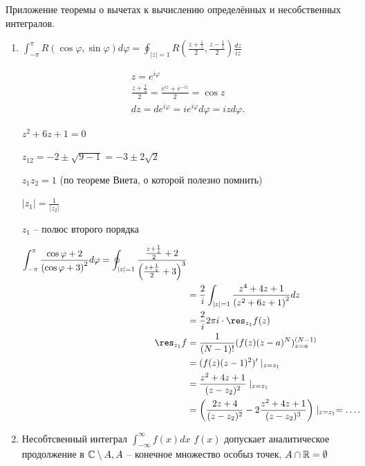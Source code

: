 Приложение теоремы о вычетах к вычислению определённых и несобственных интегралов.
\begin{enumerate}
    \item $\int_{-\pi}^{\pi} R(\cos\varphi, \sin\varphi)d\varphi = \oint_{|z| = 1} R\left( \frac{z + \frac{1}{z}}{2}, \frac{z - \frac{1}{z}}{2} \right) \frac{dz}{iz} $

    \begin{align*}
        z = e^{i\varphi}\\
        \frac{z + \frac{1}{2}}{2} = \frac{e^{iz} + e^{-iz}}{2} = \cos z\\
        dz = de^{i\varphi} = i e^{i\varphi} d \varphi = i z d \varphi.
    \end{align*}
    \begin{example}

        $z^2+6z+1 = 0$

        $z_{12} = -2\pm \sqrt{9-1} = -3\pm 2\sqrt{2}  $

        $z_1z_2 = 1$ (по теореме Виета, о которой полезно помнить)

        $|z_1| = \frac{1}{|z_2|}$

        $z_1 $ -- полюс второго порядка


        \begin{align*}
            \int_{-\pi}^{\pi}\frac{\cos \varphi + 2}{\left( \cos \varphi +3 \right) ^2} d\varphi = \oint_{|z| = 1}\frac{\frac{z + \frac{1}{z}}{2} + 2}{\left(  \frac{z + \frac{1}{z}}{2} + 3 \right) ^3}\\
            &= \frac{2}{i}\int_{|z| = 1} \frac{z^4 + 4z + 1}{\left( z^2 + 6z + 1 \right)^2 }dz \\
            &= \frac{2}{i}2\pi i \cdot \res_{z_1}f(z) \\
            \res_{z_1} f &= \frac{1}{(N-1)!} (f(z)(z-a)^N)^{(N-1)}_{z=a} \\
            &= \p{(f(z)(z-1)^2)}\mid_{z=z_1} \\
            &= \frac{z^2+4z+1}{(z-z_2)^2}\mid_{z=z_1}\\
            &= \left( \frac{2z+4}{(z-z_2)^2} - 2 \frac{z^2 + 4z+1}{(z-z_2)^3} \right)\mid_{z = z_1} = \ldots.\end{align*}
    \end{example}
    \item Несобтсвенный интеграл $\int_{-\infty }^{\infty } f\left( x \right) dx$
    $f(x)$ допускает аналитическое продолжение в $\mathbb{C} \setminus A, A$ -- конечное множество особыз точек, $A \cap \mathbb{R} = \emptyset $


\end{enumerate}
